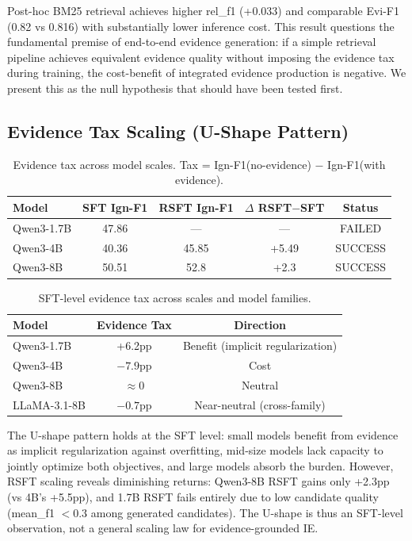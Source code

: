 \documentclass[11pt]{article}
\begin{document}
Post-hoc BM25 retrieval achieves higher rel\_f1 (+0.033) and comparable Evi-F1 (0.82 vs 0.816) with substantially lower inference cost. This result questions the fundamental premise of end-to-end evidence generation: if a simple retrieval pipeline achieves equivalent evidence quality without imposing the evidence tax during training, the cost-benefit of integrated evidence production is negative. We present this as the null hypothesis that should have been tested first.

\subsection{Evidence Tax Scaling (U-Shape Pattern)}

\begin{table}[h]
\centering
\caption{Evidence tax across model scales. Tax = Ign-F1(no-evidence) $-$ Ign-F1(with evidence).}
\label{tab:scaling}
\begin{tabular}{lcccc}
\toprule
\textbf{Model} & \textbf{SFT Ign-F1} & \textbf{RSFT Ign-F1} & \textbf{$\Delta$ RSFT$-$SFT} & \textbf{Status} \\
\midrule
Qwen3-1.7B & 47.86 & --- & --- & FAILED \\
Qwen3-4B & 40.36 & 45.85 & +5.49 & SUCCESS \\
Qwen3-8B & 50.51 & 52.8 & +2.3 & SUCCESS \\
\bottomrule
\end{tabular}
\end{table}

\begin{table}[h]
\centering
\caption{SFT-level evidence tax across scales and model families.}
\label{tab:utax}
\begin{tabular}{lcc}
\toprule
\textbf{Model} & \textbf{Evidence Tax} & \textbf{Direction} \\
\midrule
Qwen3-1.7B & +6.2pp & Benefit (implicit regularization) \\
Qwen3-4B & $-7.9$pp & Cost \\
Qwen3-8B & $\approx 0$ & Neutral \\
LLaMA-3.1-8B & $-0.7$pp & Near-neutral (cross-family) \\
\bottomrule
\end{tabular}
\end{table}

The U-shape pattern holds at the SFT level: small models benefit from evidence as implicit regularization against overfitting, mid-size models lack capacity to jointly optimize both objectives, and large models absorb the burden. However, RSFT scaling reveals diminishing returns: Qwen3-8B RSFT gains only +2.3pp (vs 4B's +5.5pp), and 1.7B RSFT fails entirely due to low candidate quality (mean\_f1 $< 0.3$ among generated candidates). The U-shape is thus an SFT-level observation, not a general scaling law for evidence-grounded IE.
\end{document}
